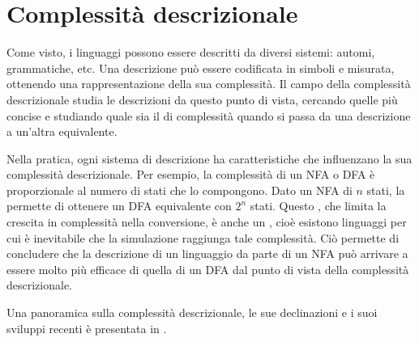 \section{Complessità descrizionale}
Come visto, i linguaggi possono essere descritti da diversi sistemi: automi, grammatiche, etc. Una descrizione può essere codificata in simboli e misurata, ottenendo una rappresentazione della sua complessità. Il campo della complessità descrizionale studia le descrizioni da questo punto di vista, cercando quelle più concise e studiando quale sia il  di complessità quando si passa da una descrizione a un'altra equivalente.

Nella pratica, ogni sistema di descrizione ha caratteristiche che influenzano la sua complessità descrizionale. Per esempio, la complessità di un NFA o DFA è proporzionale al numero di stati che lo compongono. Dato un NFA di $n$ stati, la  \cite{Rabin:59:NFA} permette di ottenere un DFA equivalente con $2^n$ stati. Questo , che limita la crescita in complessità nella conversione, è anche un , cioè esistono linguaggi per cui è inevitabile che la simulazione raggiunga tale complessità. Ciò permette di concludere che la descrizione di un linguaggio da parte di un NFA può arrivare a essere molto più efficace di quella di un DFA dal punto di vista della complessità descrizionale.

Una panoramica sulla complessità descrizionale, le sue declinazioni e i suoi sviluppi recenti è presentata in \cite{Kutrib:21:descriptional}.
